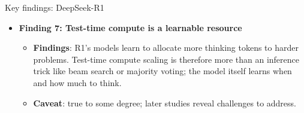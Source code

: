 \begin{frame}{Key findings: DeepSeek-R1}
  \begin{itemize}
    \item<1-> \textcolor{KAred}{\textbf{Finding 7: Test-time compute is a learnable resource}}
    \begin{itemize}
      \item \textbf{Findings}: R1's models learn to allocate more thinking tokens to harder problems. Test-time compute scaling is therefore more than an inference trick like beam search or majority voting; the model itself learns when and how much to think.
      \item \textbf{Caveat}: true to some degree; later studies reveal challenges to address.
    \end{itemize}
  \end{itemize}
\end{frame}
